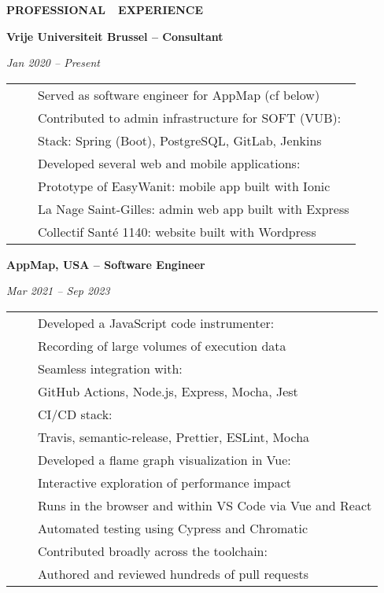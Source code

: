 \documentclass[a4paper,11pt,english]{article}
\newcommand{\MarginColumn}[0]{28pt}
\newcommand{\RightColumn}[0]{10.5cm}
\newcommand{\ItemSkip}[0]{4pt}
\newcommand{\SubItemSkip}[0]{0pt}
\newcommand{\SubSubItemSkip}[0]{0pt}
\newcommand{\Bullet}[0]{\faCaretRight~~}
\newcommand{\BeginSubRubricSkip}[0]{6pt}
\newcommand{\EndSubRubric}[0]{\vspace{4pt}}
\newcommand{\Rubric}[1]{\colorbox{gray!20}{\parbox{\linewidth}{\centering\sffamily\bfseries{}#1}}}
\newcommand{\SubRubric}[1]{\parbox{\linewidth}{\sffamily\bfseries{}#1}}
\begin{document}
\hspace{\MarginColumn}
\begin{minipage}[t]{\RightColumn}
\vspace{-18pt}\Rubric{\faBriefcase \quad PROFESSIONAL~~EXPERIENCE}\vspace{16pt}

\SubRubric{Vrije Universiteit Brussel -- Consultant}

\emph{Jan 2020 -- Present} \\[\BeginSubRubricSkip]
\begin{tabularx}{\linewidth}{@{}l@{}l@{}}
\Bullet & Served as software engineer for AppMap (cf below) \\[\ItemSkip]
\Bullet & Contributed to admin infrastructure for SOFT (VUB): \\[\SubItemSkip]
& \quad Stack: Spring (Boot), PostgreSQL, GitLab, Jenkins \\[\ItemSkip]
\Bullet & Developed several web and mobile applications: \\[\SubItemSkip]
& \quad Prototype of EasyWanit: mobile app built with Ionic \\[\SubItemSkip]
& \quad La Nage Saint-Gilles: admin web app built with Express \\[0pt]
& \quad Collectif Santé 1140: website built with Wordpress \\[\SubItemSkip]
\end{tabularx}
\EndSubRubric{}

\SubRubric{AppMap, USA -- Software Engineer}
\emph{Mar 2021 -- Sep 2023} \\[\BeginSubRubricSkip]
\begin{tabularx}{\linewidth}{@{}l@{}l@{}}
\Bullet & Developed a JavaScript code instrumenter: \\[\SubItemSkip]
& \quad Recording of large volumes of execution data \\[\SubItemSkip]
& \quad Seamless integration with: \\[\SubSubItemSkip]
& \quad \quad GitHub Actions, Node.js, Express, Mocha, Jest \\[\SubItemSkip]
& \quad CI/CD stack: \\[\SubSubItemSkip]
& \quad \quad Travis, semantic-release, Prettier, ESLint, Mocha \\[\ItemSkip]
\Bullet & Developed a flame graph visualization in Vue: \\[\SubItemSkip]
& \quad Interactive exploration of performance impact \\[\SubItemSkip]
& \quad Runs in the browser and within VS Code via Vue and React \\[\SubItemSkip]
& \quad Automated testing using Cypress and Chromatic \\[\ItemSkip]
\Bullet & Contributed broadly across the toolchain: \\[\SubItemSkip]
& \quad Authored and reviewed hundreds of pull requests \\[\ItemSkip]
\end{tabularx}
\EndSubRubric{}


\end{minipage}
\end{document}
